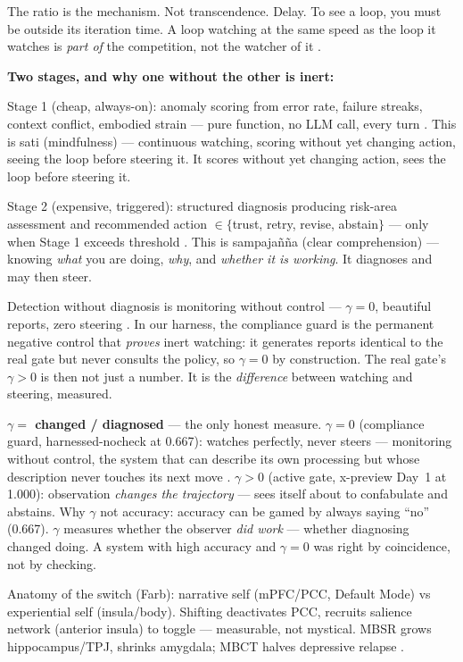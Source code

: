 \documentclass[11pt]{article}
\begin{document}
{The ratio is the mechanism. Not transcendence. Delay. To see a loop, you must be outside its iteration time. A loop watching at the same speed as the loop it watches is \emph{part of} the competition, not the watcher of it \citep{baars1997}.

\textbf{Two stages, and why one without the other is inert:}

Stage 1 (cheap, always-on): anomaly scoring from error rate, failure streaks, context conflict, embodied strain --- pure function, no LLM call, every turn \citep{macar2026}. This is sati (mindfulness) --- continuous watching, scoring without yet changing action, seeing the loop before steering it. It scores without yet changing action, sees the loop before steering it.

Stage 2 (expensive, triggered): structured diagnosis producing risk-area assessment and recommended action $\in\{$trust, retry, revise, abstain$\}$ --- only when Stage 1 exceeds threshold \citep{cao2026}. This is sampaja\~n\~na (clear comprehension) --- knowing \emph{what} you are doing, \emph{why}, and \emph{whether it is working}. It diagnoses and may then steer.

Detection without diagnosis is monitoring without control --- $\gamma=0$, beautiful reports, zero steering \citep{macar2026}. In our harness, the compliance guard is the permanent negative control that \emph{proves} inert watching: it generates reports identical to the real gate but never consults the policy, so $\gamma=0$ by construction. The real gate's $\gamma>0$ is then not just a number. It is the \emph{difference} between watching and steering, measured.

\textbf{$\gamma = $ changed / diagnosed} --- the only honest measure. $\gamma=0$ (compliance guard, harnessed-nocheck at 0.667): watches perfectly, never steers --- monitoring without control, the system that can describe its own processing but whose description never touches its next move \citep{lindsey2025,macar2026}. $\gamma>0$ (active gate, x-preview Day~1 at 1.000): observation \emph{changes the trajectory} --- sees itself about to confabulate and abstains. Why $\gamma$ not accuracy: accuracy can be gamed by always saying ``no'' (0.667). $\gamma$ measures whether the observer \emph{did work} --- whether diagnosing changed doing. A system with high accuracy and $\gamma=0$ was right by coincidence, not by checking.

Anatomy of the switch (Farb): narrative self (mPFC/PCC, Default Mode) vs experiential self (insula/body). Shifting deactivates PCC, recruits salience network (anterior insula) to toggle --- measurable, not mystical. MBSR grows hippocampus/TPJ, shrinks amygdala; MBCT halves depressive relapse \citep{seth2021}.

}
\end{document}

